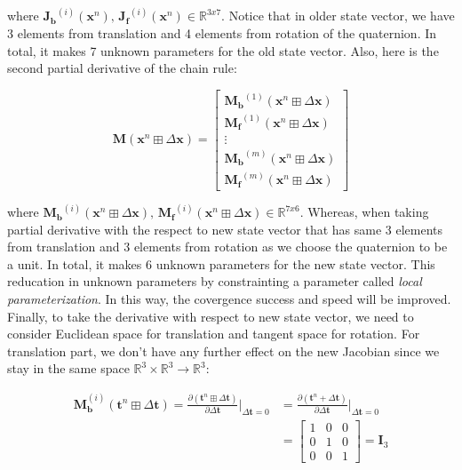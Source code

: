 \documentclass[a4paper]{report}
\numberwithin{figure}{section}
\newcommand{\R}{\mathbb{R}}
\begin{document}
where $\mathbf{J_b}^{(i)}(\mathbf{x}^n) \text{, } 
\mathbf{J_f}^{(i)}(\mathbf{x}^n) \in \R^{3x7}$. Notice that in older state 
vector, we have 3 elements from translation and 4 elements from rotation of the 
quaternion. In total, it makes 7 unknown parameters for the old state vector. 
Also, here is the second partial derivative of the chain rule:

\begin{equation}
  \mathbf{M} (\mathbf{x}^n\boxplus \Delta \mathbf{x})
  =
  \begin{bmatrix}
    \mathbf{M_b}^{(1)}(\mathbf{x}^n\boxplus \Delta \mathbf{x}) \\
    \mathbf{M_f}^{(1)}(\mathbf{x}^n\boxplus \Delta \mathbf{x}) \\
    \vdots \\
    \mathbf{M_b}^{(m)}(\mathbf{x}^n\boxplus \Delta \mathbf{x}) \\
    \mathbf{M_f}^{(m)}(\mathbf{x}^n\boxplus \Delta \mathbf{x})
  \end{bmatrix}
\end{equation}

where $\mathbf{M_b}^{(i)}(\mathbf{x}^n\boxplus \Delta \mathbf{x}) \text{, } 
\mathbf{M_f}^{(i)}(\mathbf{x}^n\boxplus \Delta \mathbf{x}) \in \R^{7x6}$.
Whereas, when taking partial derivative with the respect to 
new state vector that has same 3 elements from translation and 3 elements from 
rotation as we choose the quaternion to be a unit.
In total, it makes 6 unknown parameters for the new state vector. 
This reducation in unknown parameters by constrainting a parameter 
called \textit{local parameterization}. In this way, the covergence success and 
speed will be improved. 
Finally, to take the derivative with respect to new state vector, we need to consider 
Euclidean space for translation and tangent space for rotation. For translation part, 
we don't have any further effect on the new Jacobian since we stay in the same space 
$\R^3 \times \R^3 \rightarrow \R^3$:

\begin{equation}
  \begin{aligned}
  \mathbf{M}^{(i)}_{\mathbf{b}}(\mathbf{t}^n \boxplus \Delta \mathbf{t}) = 
    \frac{\partial (\mathbf{t}^{n} \boxplus \Delta \mathbf{t})}{\partial \Delta \mathbf{t}} 
    \bigg|_{\Delta \mathbf{t} = 0} & =
  \frac{\partial (\mathbf{t}^{n} + \Delta \mathbf{t})}{\partial \Delta \mathbf{t}}
    \bigg|_{\Delta \mathbf{t} = 0} \\
    & =
      \begin{bmatrix} 
        1 & 0 & 0 \\  
        0 & 1 & 0 \\  
        0 & 0 & 1
      \end{bmatrix} = \mathbf{I}_3
  \end{aligned}
\end{equation}
\end{document}
